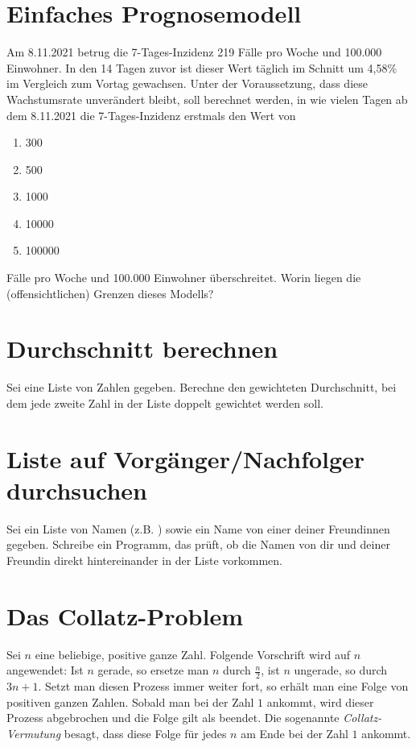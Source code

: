 \documentclass[a4paper]{article}
\begin{document}




\section{Einfaches Prognosemodell}
Am 8.11.2021 betrug die 7-Tages-Inzidenz 219 Fälle pro Woche und 100.000 Einwohner. In den 14 Tagen zuvor ist dieser Wert täglich im Schnitt um 4,58\% im Vergleich zum Vortag gewachsen. Unter der Voraussetzung, dass diese Wachstumsrate unverändert bleibt, soll berechnet werden, in wie vielen Tagen ab dem 8.11.2021 die 7-Tages-Inzidenz erstmals den Wert von 
\begin{enumerate}
\item 300
\item 500
\item 1000
\item 10000
\item 100000
\end{enumerate} 
Fälle pro Woche und 100.000 Einwohner überschreitet. Worin liegen die (offensichtlichen) Grenzen dieses Modells?  

\section{Durchschnitt berechnen}
Sei eine Liste von Zahlen gegeben. Berechne den gewichteten Durchschnitt, bei dem jede zweite Zahl in der Liste doppelt gewichtet werden soll.


\section{Liste auf Vorgänger/Nachfolger durchsuchen}
Sei ein Liste von Namen (z.B. ) sowie ein Name von einer deiner Freundinnen gegeben. Schreibe ein Programm, das prüft, ob die Namen von dir und deiner Freundin direkt hintereinander in der Liste vorkommen. 


\section{Das Collatz-Problem}
Sei $n$ eine beliebige, positive ganze Zahl. Folgende Vorschrift wird auf $n$ angewendet: Ist $n$ gerade, so ersetze man $n$ durch $\frac{n}{2}$, ist $n$ ungerade, so durch $3n + 1$. Setzt man diesen Prozess immer weiter fort, so erhält man eine Folge von positiven ganzen Zahlen. Sobald man bei der Zahl $1$ ankommt, wird dieser Prozess abgebrochen und die Folge gilt als beendet. Die sogenannte \emph{Collatz-Vermutung} besagt, dass diese Folge für jedes $n$ am Ende bei der Zahl $1$ ankommt. 
\end{document}
